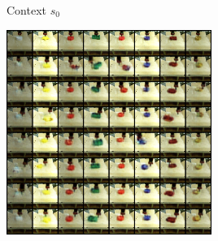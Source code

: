 \begin{figure}
    \centering
    \begin{subfigure}[b]{0.16\textwidth}
        \center
        Context $s_0$ \vspace{0.4cm}
    \end{subfigure}
    \begin{subfigure}[b]{0.4\textwidth}
        \center
         {
        }
    \end{subfigure}
    \hspace{0.1cm}
    \begin{subfigure}[b]{0.4\textwidth}
        \center
         {
        \includegraphics[height=252.5px]{ccrig/img/cvae_samples_real_pusher3b.png}
        }
    \end{subfigure}
    \vspace{0.1cm}


\end{figure}
